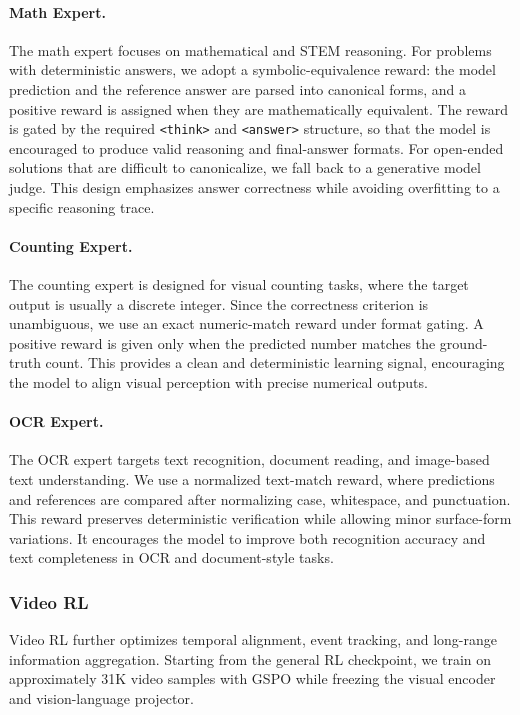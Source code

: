 \documentclass{article} %
\begin{document}
\paragraph{Math Expert.}
The math expert focuses on mathematical and STEM reasoning. For problems with deterministic answers, we adopt a symbolic-equivalence reward: the model prediction and the reference answer are parsed into canonical forms, and a positive reward is assigned when they are mathematically equivalent. The reward is gated by the required \texttt{<think>} and \texttt{<answer>} structure, so that the model is encouraged to produce valid reasoning and final-answer formats. For open-ended solutions that are difficult to canonicalize, we fall back to a generative model judge. This design emphasizes answer correctness while avoiding overfitting to a specific reasoning trace.

\paragraph{Counting Expert.}
The counting expert is designed for visual counting tasks, where the target output is usually a discrete integer. Since the correctness criterion is unambiguous, we use an exact numeric-match reward under format gating. A positive reward is given only when the predicted number matches the ground-truth count. This provides a clean and deterministic learning signal, encouraging the model to align visual perception with precise numerical outputs.

\paragraph{OCR Expert.}
The OCR expert targets text recognition, document reading, and image-based text understanding. We use a normalized text-match reward, where predictions and references are compared after normalizing case, whitespace, and punctuation. This reward preserves deterministic verification while allowing minor surface-form variations. It encourages the model to improve both recognition accuracy and text completeness in OCR and document-style tasks.


\subsubsection{Video RL}

Video RL further optimizes temporal alignment, event tracking, and long-range information aggregation. Starting from the general RL checkpoint, we train on approximately 31K video samples with GSPO while freezing the visual encoder and vision-language projector.
\end{document}
